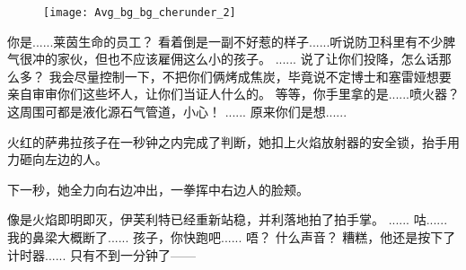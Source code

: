 \documentclass[openany]{book}
\begin{document}
\begin{figure}[h]
    \centering
    \texttt{[image: Avg\_bg\_bg\_cherunder\_2]}
\end{figure}
\begin{dialogue}
     你是......莱茵生命的员工？
     看着倒是一副不好惹的样子......听说防卫科里有不少脾气很冲的家伙，但也不应该雇佣这么小的孩子。
     ......
     说了让你们投降，怎么话那么多？
     我会尽量控制一下，不把你们俩烤成焦炭，毕竟说不定博士和塞雷娅想要亲自审审你们这些坏人，让你们当证人什么的。
     等等，你手里拿的是......喷火器？
     这周围可都是液化源石气管道，小心！
     ......
     原来你们是想......\par
    火红的萨弗拉孩子在一秒钟之内完成了判断，她扣上火焰放射器的安全锁，抬手用力砸向左边的人。\par
    下一秒，她全力向右边冲出，一拳挥中右边人的脸颊。\par
    像是火焰即明即灭，伊芙利特已经重新站稳，并利落地拍了拍手掌。
     ......
     咕......
     我的鼻梁大概断了......
     孩子，你快跑吧......
     唔？
     什么声音？
     糟糕，他还是按下了计时器......
     只有不到一分钟了——
\end{dialogue}
\end{document}
